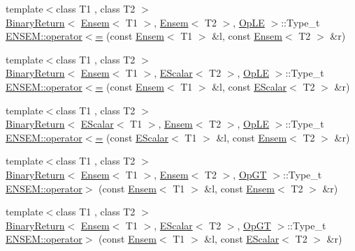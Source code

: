 \begin{DoxyCompactItemize}
\item 
{\footnotesize template$<$class T1 , class T2 $>$ }\\\mbox{\hyperlink{structENSEM_1_1BinaryReturn}{Binary\+Return}}$<$ \mbox{\hyperlink{classENSEM_1_1Ensem}{Ensem}}$<$ T1 $>$, \mbox{\hyperlink{classENSEM_1_1Ensem}{Ensem}}$<$ T2 $>$, \mbox{\hyperlink{structENSEM_1_1OpLE}{Op\+LE}} $>$\+::Type\+\_\+t \mbox{\hyperlink{group__eensem_ga2a70dca80960fd84a701d582cced7d40}{E\+N\+S\+E\+M\+::operator$<$=}} (const \mbox{\hyperlink{classENSEM_1_1Ensem}{Ensem}}$<$ T1 $>$ \&l, const \mbox{\hyperlink{classENSEM_1_1Ensem}{Ensem}}$<$ T2 $>$ \&r)
\item 
{\footnotesize template$<$class T1 , class T2 $>$ }\\\mbox{\hyperlink{structENSEM_1_1BinaryReturn}{Binary\+Return}}$<$ \mbox{\hyperlink{classENSEM_1_1Ensem}{Ensem}}$<$ T1 $>$, \mbox{\hyperlink{classENSEM_1_1EScalar}{E\+Scalar}}$<$ T2 $>$, \mbox{\hyperlink{structENSEM_1_1OpLE}{Op\+LE}} $>$\+::Type\+\_\+t \mbox{\hyperlink{group__eensem_gaf74453e608d97ecc1e832a7b2a8fe3de}{E\+N\+S\+E\+M\+::operator$<$=}} (const \mbox{\hyperlink{classENSEM_1_1Ensem}{Ensem}}$<$ T1 $>$ \&l, const \mbox{\hyperlink{classENSEM_1_1EScalar}{E\+Scalar}}$<$ T2 $>$ \&r)
\item 
{\footnotesize template$<$class T1 , class T2 $>$ }\\\mbox{\hyperlink{structENSEM_1_1BinaryReturn}{Binary\+Return}}$<$ \mbox{\hyperlink{classENSEM_1_1EScalar}{E\+Scalar}}$<$ T1 $>$, \mbox{\hyperlink{classENSEM_1_1Ensem}{Ensem}}$<$ T2 $>$, \mbox{\hyperlink{structENSEM_1_1OpLE}{Op\+LE}} $>$\+::Type\+\_\+t \mbox{\hyperlink{group__eensem_ga876b949826dc1335f76b3b4e1c32b076}{E\+N\+S\+E\+M\+::operator$<$=}} (const \mbox{\hyperlink{classENSEM_1_1EScalar}{E\+Scalar}}$<$ T1 $>$ \&l, const \mbox{\hyperlink{classENSEM_1_1Ensem}{Ensem}}$<$ T2 $>$ \&r)
\item 
{\footnotesize template$<$class T1 , class T2 $>$ }\\\mbox{\hyperlink{structENSEM_1_1BinaryReturn}{Binary\+Return}}$<$ \mbox{\hyperlink{classENSEM_1_1Ensem}{Ensem}}$<$ T1 $>$, \mbox{\hyperlink{classENSEM_1_1Ensem}{Ensem}}$<$ T2 $>$, \mbox{\hyperlink{structENSEM_1_1OpGT}{Op\+GT}} $>$\+::Type\+\_\+t \mbox{\hyperlink{group__eensem_ga27f81ac9863b6ebd1af9a0927fd2c356}{E\+N\+S\+E\+M\+::operator$>$}} (const \mbox{\hyperlink{classENSEM_1_1Ensem}{Ensem}}$<$ T1 $>$ \&l, const \mbox{\hyperlink{classENSEM_1_1Ensem}{Ensem}}$<$ T2 $>$ \&r)
\item 
{\footnotesize template$<$class T1 , class T2 $>$ }\\\mbox{\hyperlink{structENSEM_1_1BinaryReturn}{Binary\+Return}}$<$ \mbox{\hyperlink{classENSEM_1_1Ensem}{Ensem}}$<$ T1 $>$, \mbox{\hyperlink{classENSEM_1_1EScalar}{E\+Scalar}}$<$ T2 $>$, \mbox{\hyperlink{structENSEM_1_1OpGT}{Op\+GT}} $>$\+::Type\+\_\+t \mbox{\hyperlink{group__eensem_gadb5372b36c1e21728de4e36358b59440}{E\+N\+S\+E\+M\+::operator$>$}} (const \mbox{\hyperlink{classENSEM_1_1Ensem}{Ensem}}$<$ T1 $>$ \&l, const \mbox{\hyperlink{classENSEM_1_1EScalar}{E\+Scalar}}$<$ T2 $>$ \&r)

\end{DoxyCompactItemize}
